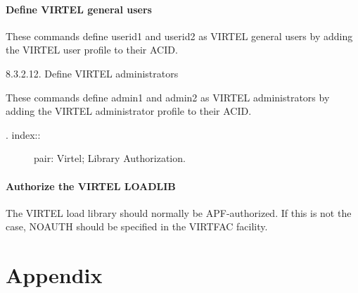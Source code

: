 \documentclass[letterpaper,10pt,english]{sphinxmanual}
\begin{document}
\subsubsection{Define VIRTEL general users}
\label{\detokenize{Installation_Guide:define-virtel-general-users}}
\begin{sphinxVerbatim}[commandchars=\\\{\}]
  
  
\end{sphinxVerbatim}


These commands define userid1 and userid2 as VIRTEL general users by adding the VIRTEL user profile to their ACID.

8.3.2.12. Define VIRTEL administrators

\begin{sphinxVerbatim}[commandchars=\\\{\}]
  
  
\end{sphinxVerbatim}


These commands define admin1 and admin2 as VIRTEL administrators by adding the VIRTEL administrator profile to their ACID.
\begin{description}
\item[{. index::}] \leavevmode
pair: Virtel; Library Authorization.

\end{description}


\subsubsection{Authorize the VIRTEL LOADLIB}
\label{\detokenize{Installation_Guide:authorize-the-virtel-loadlib}}
The VIRTEL load library should normally be APF-authorized. If this is not the case, NOAUTH should be specified in the VIRTFAC facility.


\chapter{Appendix}
\label{\detokenize{Installation_Guide:appendix}}
\end{document}

